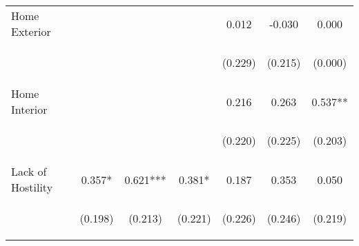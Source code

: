 \begin{tabular}{lcccccc}
\noalign{\smallskip}Home Exterior &  &  &  & 0.012 & -0.030 & 0.000\\
 & \begin{footnotesize}\end{footnotesize} & \begin{footnotesize}\end{footnotesize} & \begin{footnotesize}\end{footnotesize} & \begin{footnotesize}(0.229)\end{footnotesize} & \begin{footnotesize}(0.215)\end{footnotesize} & \begin{footnotesize}(0.000)\end{footnotesize}\\
\noalign{\smallskip}Home Interior &  &  &  & 0.216 & 0.263 & 0.537**\\
 & \begin{footnotesize}\end{footnotesize} & \begin{footnotesize}\end{footnotesize} & \begin{footnotesize}\end{footnotesize} & \begin{footnotesize}(0.220)\end{footnotesize} & \begin{footnotesize}(0.225)\end{footnotesize} & \begin{footnotesize}(0.203)\end{footnotesize}\\
\noalign{\smallskip}Lack of Hostility & 0.357* & 0.621*** & 0.381* & 0.187 & 0.353 & 0.050\\
 & \begin{footnotesize}(0.198)\end{footnotesize} & \begin{footnotesize}(0.213)\end{footnotesize} & \begin{footnotesize}(0.221)\end{footnotesize} & \begin{footnotesize}(0.226)\end{footnotesize} & \begin{footnotesize}(0.246)\end{footnotesize} & \begin{footnotesize}(0.219)\end{footnotesize}\\

\end{tabular}
